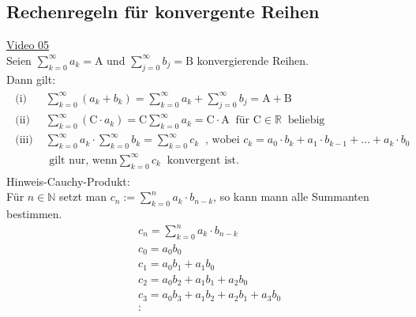 \subsection{Rechenregeln für konvergente Reihen}
\href{https://youtu.be/Hs5s1w53hmI}{Video 05}\\
Seien $ \sum\limits_{k=0}^{\infty} a_k=\mathrm{A}$ und $ \sum\limits_{j=0}^{\infty}b_j=\mathrm{B} $ konvergierende Reihen.\\
Dann gilt:\\
\begin{align*}
\begin{array}{lll}
\text{(i) }&\sum\limits_{k=0}^{\infty}(a_k+b_k)=\sum\limits_{k=0}^{\infty}a_k+\sum\limits_{j=0}^{\infty}b_j=\mathrm{A}+\mathrm{B}\\[15pt]%
\text{(ii) }&\sum\limits_{k=0}^{\infty}(\mathrm{C}\cdot a_k)=\mathrm{C}\sum\limits_{k=0}^{\infty}a_k=\mathrm{C}\cdot\mathrm{A}\;\;\text{für }\mathrm{C}\in\mathbb{R}\;\;\text{beliebig }\\[15pt]
\text{(iii) }&\sum\limits_{k=0}^{\infty}a_k\cdot\sum\limits_{k=0}^{\infty}b_k=\sum\limits_{k=0}^{\infty}c_k\;\;\text{, wobei } c_k=a_0\cdot b_k+a_1\cdot b_{k-1}+\ldots+a_k\cdot b_0\\
&\text{ gilt nur, wenn}\sum\limits_{k=0}^{\infty}c_k \;\;\text{konvergent ist. }
\end{array}
\end{align*}
Hinweis-Cauchy-Produkt: \\
Für $ n\in \mathbb{N} $ setzt man $ c_n:=\sum\limits_{k=0}^{n}a_k\cdot b_{n-k} $, so kann mann alle Summanten bestimmen.\\
\begin{align*}
&c_n=\sum\limits_{k=0}^{n}a_k\cdot b_{n-k}\\
&c_0=a_0b_0\\
&c_1=a_0b_1+a_1b_0\\
&c_2=a_0b_2+a_1b_1+a_2b_0\\
&c_3=a_0b_3+a_1b_2+a_2b_1+a_3b_0\\
&\colon
\end{align*}
